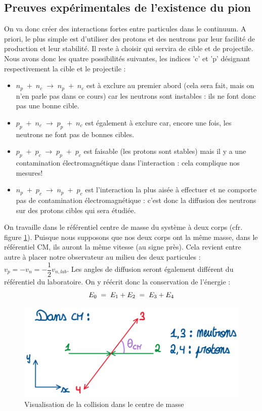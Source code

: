\subsection{Preuves expérimentales de l'existence du pion}



On va donc créer des interactions fortes entre particules dans le continuum. A priori, le plus simple est d'utiliser des protons et des neutrons par leur facilité de production et leur stabilité. Il reste à choisir qui servira de cible et de projectile. Nous avons donc les quatre possibilités suivantes, les indices 'c' et 'p' désignant respectivement la cible et le projectile :
\begin{itemize}[label=$\bullet$]
    \item $n_p\; +\; n_c\; \longrightarrow\; n_p\;+\; n_c$ est à exclure au premier abord (cela sera fait, mais on n'en parle pas dans ce cours) car les neutrons sont instables : ils ne font donc pas une bonne cible.
    \item $p_p\; +\; n_c\; \longrightarrow\; p_p \;+\; n_c$ est également à exclure car, encore une fois, les neutrons ne font pas de bonnes cibles.
    \item $p_p\; +\; p_c\; \longrightarrow\; p_p \;+\; p_c$ est faisable (les protons sont stables) mais il y a une contamination électromagnétique dans l'interaction : cela complique nos mesures!
    \item $n_p\; +\; p_c\; \longrightarrow\; n_p \;+\; p_c$ est l'interaction la plus aisée à effectuer et ne comporte pas de contamination électromagnétique : c'est donc la diffusion des neutrons sur des protons cibles qui sera étudiée.
\end{itemize}
On travaille dans le référentiel centre de masse du système à deux corps (cfr. figure \ref{collision_np_yukawa}). Puisque nous supposons que nos deux corps ont la même masse, dans le référentiel CM, ils auront la même vitesse (au signe près). Cela revient entre autre à placer notre observateur au milieu des deux particules : $v_p = -v_n = -\dfrac{1}{2}v_{n,lab}$. Les angles de diffusion seront également différent du référentiel du laboratoire. On y réécrit donc la conservation de l'énergie :
\begin{equation*}
    E_0 \; = \; E_1 + E_2 \; = \; E_3 + E_4
\end{equation*}
\begin{figure}[H]
    \centering
    \includegraphics[scale = 0.6]{Images4/collision_CM.png}
    \caption{Visualisation de la collision dans le centre de masse}
    \label{collision_np_yukawa}
\end{figure}
